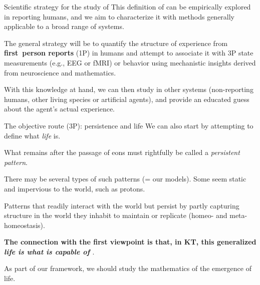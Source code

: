 \begin{frame}[label=intro3]{Scientific strategy for the study of \SEP}
This definition of \SEP can be empirically explored in reporting humans, and  we   aim to characterize it with methods generally applicable to a broad range of systems.  \vfill

  The general strategy will be  to quantify the structure of experience from {\bf first~person reports} (1P) in humans and attempt to associate it with 3P state measurements (e.g., EEG or fMRI) or behavior using mechanistic insights derived from  neuroscience and mathematics.  \vfill
  
  With this knowledge at hand, we can then study \SEP in other systems (non-reporting humans, other living species or artificial agents), %
  and provide an educated guess about the agent’s actual experience.

\end{frame}

\begin{frame}[label=intro4]{The objective route (3P): persistence and life}
We can also start by attempting to define what {\em life} is.\vfill

What remains after the passage of eons must rightfully be called a {\em persistent pattern}.\vfill

There may be several types of such patterns (= our models). Some seem static and impervious to the world, such as protons.  \vfill

\begin{definition}[Life]
Patterns that readily interact  with the world but persist by partly capturing  structure in the world they inhabit to maintain or replicate  (homeo- and meta-homeostasis).  \end{definition}\vfill

 {\bf The connection with the first viewpoint is that, in KT, this {generalized \em life is what is capable of \SEP}}. \vfill 
 
 As part of our framework, we should study the mathematics of the emergence of life. 
\end{frame}




